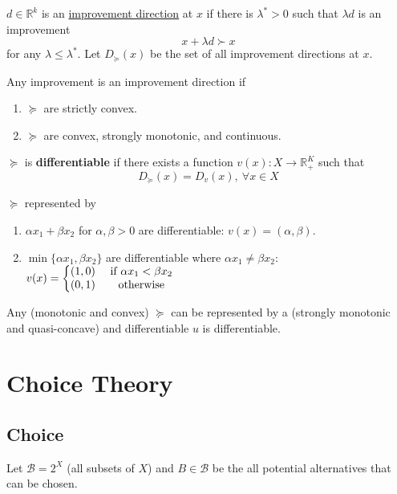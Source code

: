 \documentclass[11pt]{elegantbook}
\begin{document}
$d\in \mathbb{R}^k$ is an \underline{improvement direction} at $x$ if there is $\lambda^*>0$ such that $\lambda d$ is an improvement $$x+\lambda d\succ x$$
for any $\lambda\leq \lambda^*$. Let $D_{\succeq}(x)$ be the set of all improvement directions at $x$.

Any improvement is an improvement direction if
\begin{enumerate}[-]
    \item $\succeq$ are strictly convex.
    \item $\succeq$ are convex, strongly monotonic, and continuous.
\end{enumerate}

\begin{definition}
    \normalfont
    $\succeq$ is \textbf{differentiable} if there exists a function $v(x): X \rightarrow \mathbb{R}_+^K$ such that $$D_{\succeq}(x)=D_v(x),\ \forall x\in X$$
\end{definition}

\begin{example}
    $\succeq$ represented by
    \begin{enumerate}[(1).]
        \item $\alpha x_1+\beta x_2$ for $\alpha,\beta>0$ are differentiable: $v(x)=(\alpha,\beta)$.
        \item $\min\{\alpha x_1,\beta x_2\}$ are differentiable where $\alpha x_1\neq \beta x_2$: $v(x)=\left\{\begin{matrix}
            (1,0)& \textnormal{ if }\alpha x_1<\beta x_2\\
            (0,1)& \textnormal{ otherwise}
        \end{matrix}\right.$
    \end{enumerate}
\end{example}

\begin{proposition}
    Any (monotonic and convex) $\succeq$ can be represented by a (strongly monotonic and quasi-concave) and differentiable $u$ is differentiable.
\end{proposition}


\chapter{Choice Theory}
\section{Choice}
Let $\mathcal{B}=2^X$ (all subsets of $X$) and $B\in \mathcal{B}$ be the all potential alternatives that can be chosen.
\end{document}
